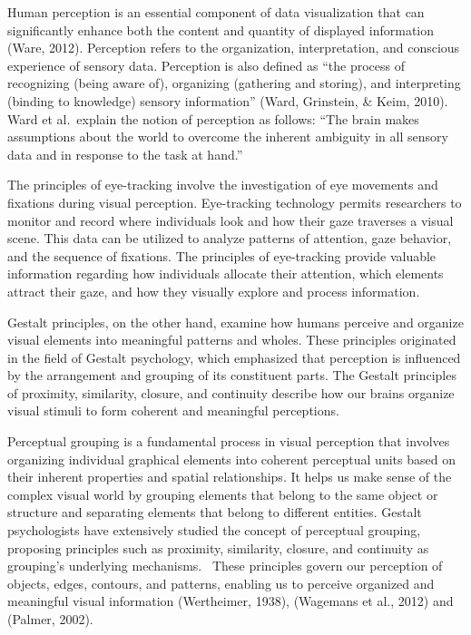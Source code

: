 \documentclass[print]{nuthesis}
\begin{document}
Human perception is an essential component of data visualization that can significantly enhance both the content and quantity of displayed information (Ware, 2012).
Perception refers to the organization, interpretation, and conscious experience of sensory data.
Perception is also defined as ``the process of recognizing (being aware of), organizing (gathering and storing), and interpreting (binding to knowledge) sensory information'' (Ward, Grinstein, \& Keim, 2010).
Ward et al.~explain the notion of perception as follows: ``The brain makes assumptions about the world to overcome the inherent ambiguity in all sensory data and in response to the task at hand.''

The principles of eye-tracking involve the investigation of eye movements and fixations during visual perception.
Eye-tracking technology permits researchers to monitor and record where individuals look and how their gaze traverses a visual scene.
This data can be utilized to analyze patterns of attention, gaze behavior, and the sequence of fixations.
The principles of eye-tracking provide valuable information regarding how individuals allocate their attention, which elements attract their gaze, and how they visually explore and process information.

Gestalt principles, on the other hand, examine how humans perceive and organize visual elements into meaningful patterns and wholes.
These principles originated in the field of Gestalt psychology, which emphasized that perception is influenced by the arrangement and grouping of its constituent parts.
The Gestalt principles of proximity, similarity, closure, and continuity describe how our brains organize visual stimuli to form coherent and meaningful perceptions.

Perceptual grouping is a fundamental process in visual perception that involves organizing individual graphical elements into coherent perceptual units based on their inherent properties and spatial relationships.
It helps us make sense of the complex visual world by grouping elements that belong to the same object or structure and separating elements that belong to different entities. Gestalt psychologists have extensively studied the concept of perceptual grouping, proposing principles such as proximity, similarity, closure, and continuity as grouping's underlying mechanisms.~
These principles govern our perception of objects, edges, contours, and patterns, enabling us to perceive organized and meaningful visual information (Wertheimer, 1938), (Wagemans et al., 2012) and (Palmer, 2002).
\end{document}
